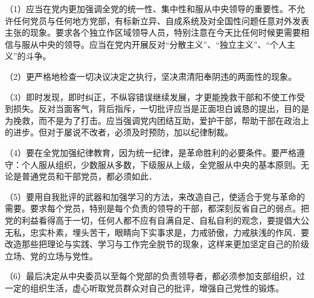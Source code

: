 （1）应当在党内更加强调全党的统一性、集中性和服从中央领导的重要性。不允许任何党员与任何地方党部，有标新立异、自成系统及对全国性问题任意对外发表主张的现象。要求各个独立作区域领导人员，特别注意在今天比任何时候更需要相信与服从中央的领导。应当在党内开展反对“分散主义”、“独立主义”、“个人主义”的斗争。

（2）更严格地检查一切决议决定之执行，坚决肃清阳奉阴违的两面性的现象。

（3）即时发现，即时纠正，不纵容错误继续发展，才更能挽救干部和不使工作受到损失。反对当面客气，背后指斥，一切批评应当是正面坦白诚恳的提出，目的是为挽救，而不是为了打击。应当强调党内团结互助，爱护干部，帮助干部在政治上的进步。但对于屡说不改者，必须及时预防，加以纪律制裁。

（4）要在全党加强纪律教育，因为统一纪律，是革命胜利的必要条件。要严格遵守：个人服从组织，少数服从多数，下级服从上级，全党服从中央的基本原则。无论是普通党员和干部党员，都必须如此．

（5）要用自我批评的武器和加强学习的方法，来改造自己，使适合于党与革命的需要。要求每个党员，特别是每个负责的领导的干部，都深刻反省自己的弱点。把党的利益看得高于一切，任何人都不应有自满自足、自私自利的观念，要提倡大公无私，忠实朴素，埋头苦干，眼睛向下实事求是，力戒骄傲，力戒肤浅的作风．要改造那些把理论与实践、学习与工作完全脱节的现象，这样来更加坚定自己的阶级立场、党的立场与党性。

（6）最后决定从中央委员以至每个党部的负责领导者，都必须参加支部组织，过一定的组织生活，虚心听取党员群众对自己的批评，增强自己党性的锻炼。

